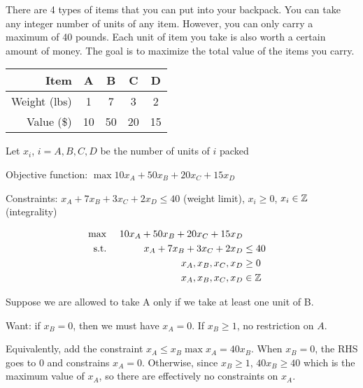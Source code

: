 \begin{example}
  There are 4 types of items that you can put into your backpack. You can take any integer number of units of any item. However, you can only carry a maximum of 40 pounds. Each unit of item you take is also worth a certain amount of money. The goal is to maximize the total value of the items you carry.
  \begin{center}
    \begin{tabular}{r|cccc}
      Item         & A  & B  & C  & D  \\ \hline
      Weight (lbs) & 1  & 7  & 3  & 2  \\
      Value (\$)   & 10 & 50 & 20 & 15 \\
    \end{tabular}
  \end{center}
\end{example}
\begin{sol}
  Let $x_i$, $i = A,B,C,D$ be the number of units of $i$ packed

  Objective function: $\max 10x_A + 50x_B + 20x_C + 15x_D$

  Constraints: $x_A + 7x_B + 3x_C + 2x_D \leq 40$ (weight limit), $x_i \geq 0$, $x_i \in \mathbb{Z}$ (integrality)

  \[
    \begin{aligned}
      \max\         &  & 10x_A + 50x_B + 20x_C + 15x_D           \\
      \text{s.t.}\  &  & x_A + 7x_B + 3x_C + 2x_D      & \leq 40 \\
                    &  & x_A,x_B,x_C,x_D               & \geq 0  \\
                    &  & x_A,x_B,x_C,x_D               & \in \mathbb{Z}
    \end{aligned}
  \]
\end{sol}

\begin{example}
  Suppose we are allowed to take A only if we take at least one unit of B.
\end{example}
\begin{sol}
  Want: if $x_B = 0$, then we must have $x_A = 0$. If $x_B \geq 1$, no restriction on $A$.

  Equivalently, add the constraint $x_A \leq x_B \max x_A = 40x_B$. When $x_B = 0$, the RHS goes to $0$ and constrains $x_A = 0$. Otherwise, since $x_B \geq 1$, $40x_B \geq 40$ which is the maximum value of $x_A$, so there are effectively no constraints on $x_A$.
\end{sol}

